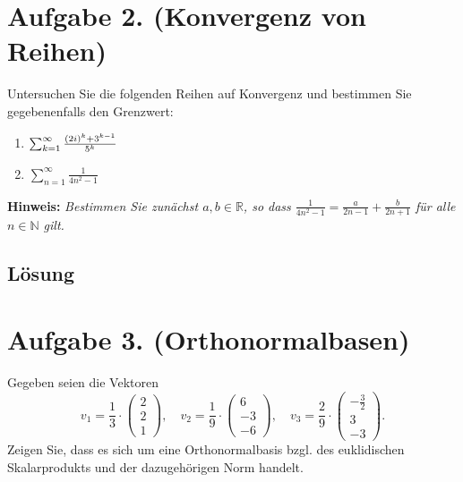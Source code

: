 \documentclass[german,12pt]{homework}
\newcommand{\NN}{\mathbb{N}}
\newcommand{\RR}{\mathbb{R}}
\DeclarePairedDelimiter{\enbrace}{(}{)}
\begin{document}
    \section*{Aufgabe 2. (Konvergenz von Reihen)}

    \begin{problem}
        Untersuchen Sie die folgenden Reihen auf Konvergenz und bestimmen Sie
        gegebenenfalls den Grenzwert:
        \begin{enumerate}
            \item \(\sum_{k = 1}^\infty\frac{\enbrace*{2i}^k + 3^{k - 1}}{5^k}\)
            \item \(\sum_{n = 1}^\infty\frac{1}{4n^2 - 1}\)
        \end{enumerate}

        \textbf{Hinweis:} \emph{Bestimmen Sie zunächst \(a, b \in \RR\), so
        dass \(\frac{1}{4n^2 - 1} = \frac{a}{2n - 1} + \frac{b}{2n + 1}\) für
        alle \(n \in \NN\) gilt.}
    \end{problem}

    \subsection*{Lösung}

    \section*{Aufgabe 3. (Orthonormalbasen)}

    \begin{problem}
        Gegeben seien die Vektoren
        \[v_1 = \frac{1}{3} \cdot \begin{pmatrix}2\\2\\1\end{pmatrix}, \quad
        v_2 = \frac{1}{9} \cdot \begin{pmatrix}6\\-3\\-6\end{pmatrix}, \quad
        v_3 = \frac{2}{9} \cdot \begin{pmatrix}-\frac{3}{2}\\3\\-3
        \end{pmatrix}.\]
        Zeigen Sie, dass es sich um eine Orthonormalbasis bzgl. des
        euklidischen Skalarprodukts und der dazugehörigen Norm handelt.
    \end{problem}
\end{document}
